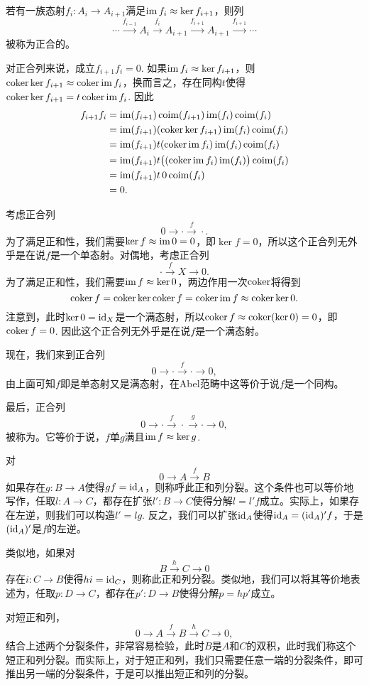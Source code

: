 \begin{para}
若有一族态射$f_i:A_i\to A_{i+1}$满足$\operatorname{im} f_i\approx \ker f_{i+1}$，则列
\[
	\cdots \xrightarrow{f_{i-1}}A_i \xrightarrow{f_i} A_{i+1} \xrightarrow{f_{i+1}} A_{i+1}\xrightarrow{f_{i+1}}\cdots
\]
被称为正合的。
\end{para}

对正合列来说，成立$f_{i+1}f_i=0$. 如果$\operatorname{im} f_i\approx \ker f_{i+1}$，则$\operatorname{coker} \ker f_{i+1} \approx \operatorname{coker} \operatorname{im} f_i$，换而言之，存在同构$t$使得$\operatorname{coker} \ker f_{i+1}=t\operatorname{coker} \operatorname{im} f_i$. 因此
\begin{align*}
f_{i+1}f_i&=\operatorname{im}(f_{i+1})\operatorname{coim}(f_{i+1})\operatorname{im}(f_{i})\operatorname{coim}(f_{i})\\
	&=\operatorname{im}(f_{i+1})(\operatorname{coker} \ker f_{i+1}) \operatorname{im}(f_{i})\operatorname{coim}(f_{i})\\
	&=\operatorname{im}(f_{i+1})t(\operatorname{coker} \operatorname{im} f_i) \operatorname{im}(f_{i})\operatorname{coim}(f_{i})\\
	&=\operatorname{im}(f_{i+1})t\bigl((\operatorname{coker} \operatorname{im} f_i) \operatorname{im}(f_{i})\bigr)\operatorname{coim}(f_{i})\\
	&=\operatorname{im}(f_{i+1})t\,0\operatorname{coim}(f_{i})\\
	&=0.
\end{align*}

\begin{para}[短正合列]
考虑正合列
\[
	0\to \cdot \xrightarrow{f} \cdot.
\]
为了满足正和性，我们需要$\ker f \approx \operatorname{im} 0=0$，即$\ker f = 0$，所以这个正合列无外乎是在说$f$是一个单态射。对偶地，考虑正合列
\[
	\cdot\xrightarrow{f} X \to  0.
\]
为了满足正和性，我们需要$\operatorname{im} f \approx \ker 0$，两边作用一次$\operatorname{coker}$将得到
\[
	\operatorname{coker} f=\operatorname{coker} \ker \operatorname{coker} f=\operatorname{coker} \operatorname{im} f \approx \operatorname{coker} \ker 0.
\]
注意到，此时$\ker 0=\operatorname{id}_X$是一个满态射，所以$\operatorname{coker} f \approx \operatorname{coker}(\ker 0)=0$，即$\operatorname{coker} f = 0$. 因此这个正合列无外乎是在说$f$是一个满态射。

现在，我们来到正合列
\[
	0\to \cdot \xrightarrow{f} \cdot \to 0,
\]
由上面可知$f$即是单态射又是满态射，在Abel范畴中这等价于说$f$是一个同构。

最后，正合列
\[
	0\to \cdot \xrightarrow{f} \cdot \xrightarrow{g}\cdot\to 0,
\]
被称为。它等价于说，$f$单$g$满且$\operatorname{im} f\approx \ker g$.
\end{para}

\begin{para}[分裂正和序列]
对
\[
	0\to A\xrightarrow{f}B
\]
如果存在$g:B\to A$使得$gf=\operatorname{id}_A$，则称呼此正和列分裂。这个条件也可以等价地写作，任取$l:A\to C$，都存在扩张$l':B\to C$使得分解$l=l'f$成立。实际上，如果存在左逆，则我们可以构造$l'=lg$. 反之，我们可以扩张$\operatorname{id}_A$使得$\operatorname{id}_A=(\operatorname{id}_A)'f$，于是$(\operatorname{id}_A)'$是$f$的左逆。

类似地，如果对
\[
	B\xrightarrow{h}C\to 0
\]
存在$i:C\to B$使得$hi=\operatorname{id}_C$，则称此正和列分裂。类似地，我们可以将其等价地表述为，任取$p:D\to C$，都存在$p':D\to B$使得分解$p=hp'$成立。

对短正和列，
\[
	0\to A\xrightarrow{f}B\xrightarrow{h}C\to 0,
\]
结合上述两个分裂条件，非常容易检验，此时$B$是$A$和$C$的双积，此时我们称这个短正和列分裂。而实际上，对于短正和列，我们只需要任意一端的分裂条件，即可推出另一端的分裂条件，于是可以推出短正和列的分裂。
\end{para}


